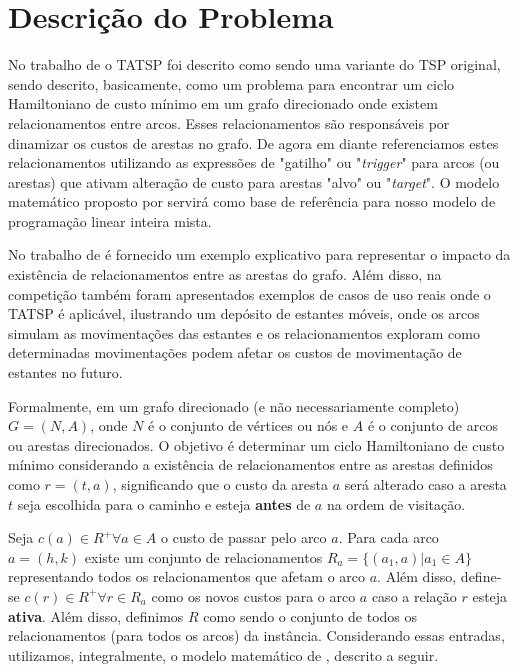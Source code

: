\chapter{Descrição do Problema}
\label{chap:problem_description}

\noindent No trabalho de \textcite{Carmine2025} o TATSP foi descrito como sendo uma variante do TSP original, sendo descrito, basicamente, como um problema para encontrar um ciclo Hamiltoniano de custo mínimo em um grafo direcionado onde existem relacionamentos entre arcos. Esses relacionamentos são responsáveis por dinamizar os custos de arestas no grafo. De agora em diante referenciamos estes relacionamentos utilizando as expressões de "gatilho" ou "\emph{trigger}" para arcos (ou arestas) que ativam alteração de custo para arestas "alvo" ou "\emph{target}". O modelo matemático proposto por \textcite{Carmine2025} servirá como base de referência para nosso modelo de programação linear inteira mista.

No trabalho de \textcite{Carmine2025} é fornecido um exemplo explicativo para representar o impacto da existência de relacionamentos entre as arestas do grafo. Além disso, na competição \textcite{MESS2024} também foram apresentados exemplos de casos de uso reais onde o TATSP é aplicável, ilustrando um depósito de estantes móveis, onde os arcos simulam as movimentações das estantes e os relacionamentos exploram como determinadas movimentações podem afetar os custos de movimentação de estantes no futuro.

Formalmente, em um grafo direcionado (e não necessariamente completo) $G = (N, A)$, onde $N$ é o conjunto de vértices ou nós e $A$ é o conjunto de arcos ou arestas direcionados. O objetivo é determinar um ciclo Hamiltoniano de custo mínimo considerando a existência de relacionamentos entre as arestas definidos como $r = (t, a)$, significando que o custo da aresta $a$ será alterado caso a aresta $t$ seja escolhida para o caminho e esteja \textbf{antes} de $a$ na ordem de visitação.

Seja $c(a) \in R^{+} \forall a \in A$ o custo de passar pelo arco $a$. Para cada arco $a = (h,k)$ existe um conjunto de relacionamentos $R_a = \{(a_1, a) | a_1 \in A\}$ representando todos os relacionamentos que afetam o arco $a$. Além disso, define-se $c(r) \in R^{+} \forall r \in R_a$ como os novos custos para o arco $a$ caso a relação $r$ esteja \textbf{ativa}. Além disso, definimos $R$ como sendo o conjunto de todos os relacionamentos (para todos os arcos) da instância. Considerando essas entradas, utilizamos, integralmente, o modelo matemático de \textcite{Carmine2025}, descrito a seguir.


